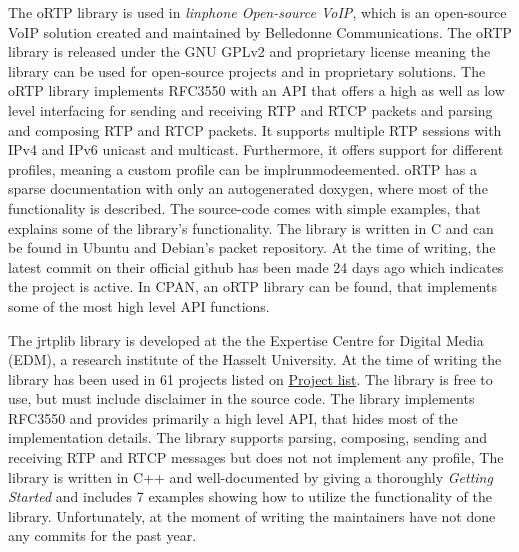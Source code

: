 \noindent{} 
The oRTP library is used in \textit{linphone Open-source VoIP}, which is an open-source VoIP solution created and maintained by Belledonne Communications. The oRTP library is released under the GNU GPLv2 and proprietary license meaning the library can be used for open-source projects and in proprietary solutions.
The oRTP library implements RFC3550 with an API that offers a high as well as low level interfacing for sending and receiving RTP and RTCP packets and parsing and composing RTP and RTCP packets. It supports multiple RTP sessions with IPv4 and IPv6 unicast and multicast. Furthermore, it offers support for different profiles, meaning a custom profile can be implrunmodeemented.  oRTP has a sparse documentation with only an autogenerated doxygen, where most of the functionality is described. The source-code comes with simple examples, that explains some of the library's functionality. The library is written in C and can be found in Ubuntu and Debian's packet repository. At the time of writing, the latest commit on their official github has been made 24 days ago which indicates the project is active. In CPAN, an oRTP library can be found, that implements some of the most high level API functions.


The jrtplib library is developed at the the Expertise Centre for Digital Media (EDM), a research institute of the Hasselt University. At the time of writing the library has been used in 61 projects listed on \href{http://research.edm.uhasselt.be/jori/cgi-bin/listprojects.py?name=jrtplib}{Project list}. The library is free to use, but must include disclaimer in the source code. The library implements RFC3550 and provides primarily a high level API, that hides most of the implementation details. The library supports parsing, composing, sending and receiving RTP and RTCP messages but does not not implement any profile, The library is written in C++ and well-documented by giving a thoroughly \textit{Getting Started} and includes 7 examples showing how to utilize the functionality of the library. Unfortunately, at the moment of writing the maintainers have not done any commits for the past year.

